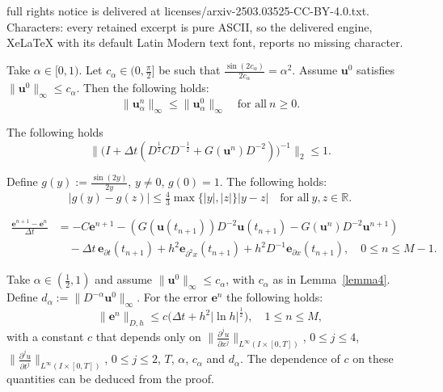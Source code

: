 \documentclass[10pt,a4paper]{amsart}
\newcommand{\R}{\mathbb{R}}
\newcommand{\be}{\mathbf e}
\newcommand{\bu}{\mathbf u}
\begin{document}
full rights notice is delivered at licenses/arxiv-2503.03525-CC-BY-4.0.txt. Characters: every retained excerpt is pure ASCII, so the delivered engine, XeLaTeX with its default Latin Modern text font, reports no missing character.
\begin{lemma} \label{lemma4}
 Take $\alpha \in [0,1)$. Let $c_\alpha \in (0,\tfrac{\pi}{2}]$ be such that $\frac{\sin(2c_\alpha)}{2c_\alpha}=\alpha^2$.  Assume $\bu^0$ satisfies $\|\bu^0\|_\infty \leq c_\alpha$. Then the following holds:
 \[
   \|\bu_\alpha^n\|_\infty \leq \|\bu_\alpha^0\|_\infty \quad \text{for all}~n \geq 0.
 \]
\end{lemma}

 \begin{lemma} \label{lemma5}
  The following holds
  \begin{equation} \label{bound1}
    \|\big(I+ \Delta t(D^\frac12 C D^{- \frac12} +G(\bu^n)D^{-2})\big)^{-1}\|_2 \leq 1.
  \end{equation}
 \end{lemma}

\begin{lemma} \label{lemma8}
 Define $g(y):=\frac{\sin(2y)}{2y}$, $y \neq 0$, $g(0)=1$. The following holds:
 \[ 
  |g(y) - g(z)| \leq \tfrac43 \max \{|y|,|z|\} |y-z| \quad \text{for all}~ y,z \in \R.
 \]
\end{lemma}

\begin{equation} \label{erreq2} \begin{split}
 \frac{\be^{n+1}- \be^n}{\Delta t}  & = - C\be^{n+1} - \left(G(\bu(t_{n+1}))D^{-2}\bu(t_{n+1})- G(\bu^n)D^{-2}\bu^{n+1}\right)  \\  & \quad  -\Delta t \,\be_{\partial t}(t_{n+1}) +   h^2 \be_{\partial^2 x}(t_{n+1})+h^2 D^{-1}\be_{\partial x}(t_{n+1}), \quad 0 \leq n \leq M-1.
 \end{split}
\end{equation}

\begin{theorem} \label{mainthm}    Take $\alpha  \in (\tfrac12, 1)$ and assume $\|\bu^0\|_\infty \leq c_\alpha$, with $c_\alpha$ as in Lemma~\ref{lemma4}.
Define $d_\alpha:=\|D^{-\alpha}\bu^0\|_\infty$.  
For the error $\be^n$ the following holds:
\begin{equation} \label{optboound}
  \|\be^n\|_{D,h} \leq   c \big( \Delta t + h^2 |\ln h|^\frac12), \quad 1 \leq n \leq M,
\end{equation}
with a constant $c$ that depends only on $\|\frac{\partial^j u}{\partial  x^j}\|_{L^\infty(I\times[0,T])}$,  $0 \leq j \leq 4$, $\| \frac{\partial^j u}{\partial t^j}\|_{L^\infty(I\times[0,T])}$,  $0 \leq j \leq 2$,  $T$, $\alpha$, $c_\alpha$ and $d_\alpha$. The dependence of $c$ on these quantities can be deduced from the proof.
\end{theorem}
\end{document}
